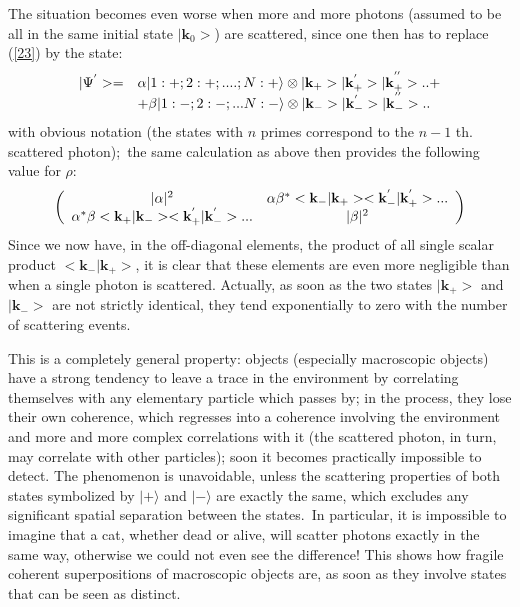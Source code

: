 \documentclass[12pt,onecolumn]{article}%
\begin{document}
The situation becomes even worse when more and more photons (assumed to be all
in the same initial state $|\mathbf{k}_{0}>$) are scattered, since one then
has to replace (\ref{23}) by the state:%
\begin{equation}%
\begin{array}
[c]{cl}%
|\Psi^{^{\prime}}>= & \alpha|1:+;2:+;....;N:+\rangle \otimes|\mathbf{k}%
_{+}>|\mathbf{k}_{+}^{^{\prime}}>|\mathbf{k}_{+}^{^{^{\prime\prime}}%
}>..+\\
& +\beta|1:-;2:-;...N:-\rangle \otimes|\mathbf{k}_{-}>|\mathbf{k}%
_{-}^{^{\prime}}>|\mathbf{k}_{-}^{^{^{\prime\prime}}}>..
\end{array}
\label{25}%
\end{equation}
with obvious notation (the states with $n$ primes correspond to the $n-1$ th.
scattered photon);\ the same calculation as above then provides the following
value for $\rho$:%
\begin{equation}
\left(
\begin{array}
[c]{cc}%
|\alpha|^{2} & \alpha\beta^{\ast}<\mathbf{k}_{-}|\mathbf{k}%
_{+}><\mathbf{k}_{-}^{^{\prime}}|\mathbf{k}_{+}^{^{\prime}}>...\\
\alpha^{\ast}\beta<\mathbf{k}_{+}|\mathbf{k}_{-}><\mathbf{k}_{+}^{^{\prime
}}|\mathbf{k}_{-}^{^{\prime}}>... & |\beta|^{2}%
\end{array}
\right)  \label{26}%
\end{equation}
Since we now have, in the off-diagonal elements, the product of all single
scalar product $<\mathbf{k}_{-}|\mathbf{k}_{+}>$, it is clear that these
elements are even more negligible than when a single photon is scattered.
Actually, as soon as the two states $|\mathbf{k}_{+}>$ and $|
\mathbf{k}_{-}>$ are not strictly identical, they tend exponentially to zero
with the number of scattering events.

This is a completely general property: objects (especially macroscopic
objects) have a strong tendency to leave a trace in the environment by
correlating themselves with any elementary particle which passes by; in the
process, they lose their own coherence, which regresses into a coherence
involving the environment and more and more complex correlations with it (the
scattered photon, in turn, may correlate with other particles); soon it
becomes practically impossible to detect. The phenomenon is unavoidable,
unless the scattering properties of both states symbolized by $|+\rangle $ and
$|-\rangle $ are exactly the same, which excludes any significant spatial
separation between the states.\ In particular, it is impossible to imagine
that a cat, whether dead or alive, will scatter photons exactly in the same
way, otherwise we could not even see the difference! This shows how fragile
coherent superpositions of macroscopic objects are, as soon as they involve
states that can be seen as distinct.
\end{document}
